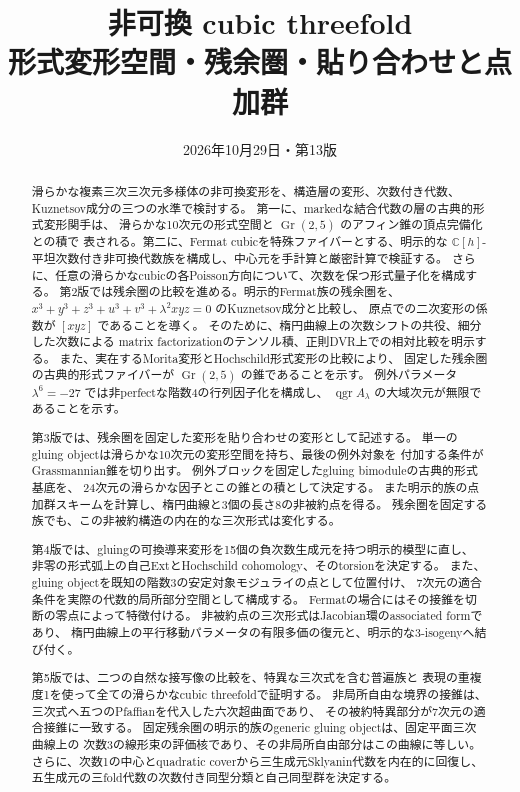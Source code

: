 \documentclass[a4paper,11pt]{ltjsarticle}
\title{\bfseries 非可換 cubic threefold\\[0.35em]
\large 形式変形空間・残余圏・貼り合わせと点加群}
\author{}
\date{2026年10月29日・第13版}
\theoremstyle{definition}
\newcommand{\CC}{\mathbb C}
\newcommand{\Gr}{\operatorname{Gr}}
\newcommand{\qgr}{\operatorname{qgr}}
\begin{document}
\maketitle
\vspace{-1.5em}
\begin{abstract}
滑らかな複素三次三次元多様体の非可換変形を、構造層の変形、次数付き代数、
Kuznetsov成分の三つの水準で検討する。
第一に、markedな結合代数の層の古典的形式変形関手は、
滑らかな10次元の形式空間と $\Gr(2,5)$ のアフィン錐の頂点完備化との積で
表される。第二に、Fermat cubicを特殊ファイバーとする、明示的な
$\CC[h]$-平坦次数付き非可換代数族を構成し、中心元を手計算と厳密計算で検証する。
さらに、任意の滑らかなcubicの各Poisson方向について、次数を保つ形式量子化を構成する。
第2版では残余圏の比較を進める。明示的Fermat族の残余圏を、
$x^3+y^3+z^3+u^3+v^3+\lambda^2xyz=0$ のKuznetsov成分と比較し、
原点での二次変形の係数が $[xyz]$ であることを導く。
そのために、楕円曲線上の次数シフトの共役、細分した次数による
matrix factorizationのテンソル積、正則DVR上での相対比較を明示する。
また、実在するMorita変形とHochschild形式変形の比較により、
固定した残余圏の古典的形式ファイバーが $\Gr(2,5)$ の錐であることを示す。
例外パラメータ $\lambda^6=-27$ では非perfectな階数4の行列因子化を構成し、
$\qgr A_\lambda$ の大域次元が無限であることを示す。

第3版では、残余圏を固定した変形を貼り合わせの変形として記述する。
単一のgluing objectは滑らかな10次元の変形空間を持ち、最後の例外対象を
付加する条件がGrassmannian錐を切り出す。
例外ブロックを固定したgluing bimoduleの古典的形式基底を、
24次元の滑らかな因子とこの錐との積として決定する。
また明示的族の点加群スキームを計算し、楕円曲線と3個の長さ8の非被約点を得る。
残余圏を固定する族でも、この非被約構造の内在的な三次形式は変化する。

第4版では、gluingの可換導来変形を15個の負次数生成元を持つ明示的模型に直し、
非零の形式弧上の自己ExtとHochschild cohomology、そのtorsionを決定する。
また、gluing objectを既知の階数3の安定対象モジュライの点として位置付け、
7次元の適合条件を実際の代数的局所部分空間として構成する。
Fermatの場合にはその接錐を切断の零点によって特徴付ける。
非被約点の三次形式はJacobian環のassociated formであり、
楕円曲線上の平行移動パラメータの有限多価の復元と、明示的な3-isogenyへ結び付く。

第5版では、二つの自然な接写像の比較を、特異な三次式を含む普遍族と
表現の重複度1を使って全ての滑らかなcubic threefoldで証明する。
非局所自由な境界の接錐は、三次式へ五つのPfaffianを代入した六次超曲面であり、
その被約特異部分が7次元の適合接錐に一致する。
固定残余圏の明示的族のgeneric gluing objectは、固定平面三次曲線上の
次数3の線形束の評価核であり、その非局所自由部分はこの曲線に等しい。
さらに、次数1の中心とquadratic coverから三生成元Sklyanin代数を内在的に回復し、
五生成元の三fold代数の次数付き同型分類と自己同型群を決定する。


\end{abstract}
\end{document}
